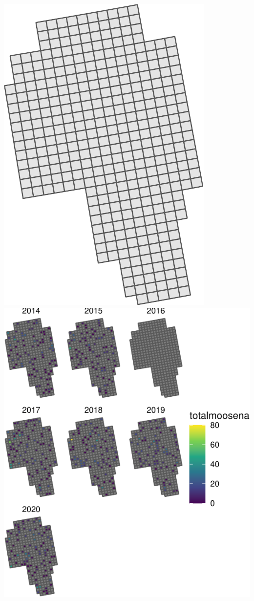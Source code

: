 \documentclass[]{interact}
\theoremstyle{plain}%
\theoremstyle{definition}
\theoremstyle{remark}
\begin{document}
\includegraphics{fpspatiotemp_manu_files/figure-latex/unnamed-chunk-4-1.pdf}
\includegraphics{fpspatiotemp_manu_files/figure-latex/unnamed-chunk-4-2.pdf}
\end{document}
